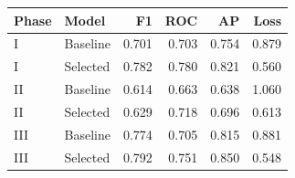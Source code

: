 \begin{tabular}{llrrrr}
\toprule
Phase & Model & F1 & ROC & AP & Loss \\
\midrule
I & Baseline & 0.701 & 0.703 & 0.754 & 0.879 \\
I & Selected & 0.782 & 0.780 & 0.821 & 0.560 \\
II & Baseline & 0.614 & 0.663 & 0.638 & 1.060 \\
II & Selected & 0.629 & 0.718 & 0.696 & 0.613 \\
III & Baseline & 0.774 & 0.705 & 0.815 & 0.881 \\
III & Selected & 0.792 & 0.751 & 0.850 & 0.548 \\
\bottomrule
\end{tabular}
